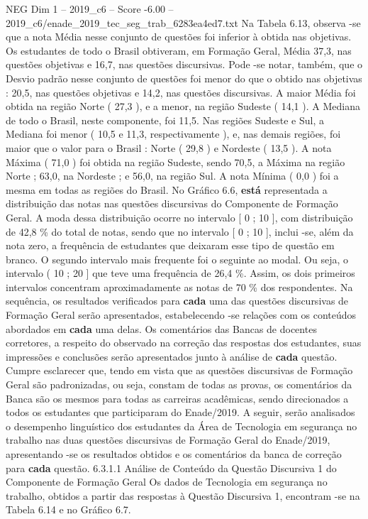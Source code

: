 \begin{textsample}{NEG Dim 1 – 2019\_c6 – Score -6.00 – 2019\_c6/enade\_2019\_tec\_seg\_trab\_6283ea4ed7.txt}
Na Tabela 6.13, observa -se que a nota Média nesse conjunto de questões foi inferior à obtida nas objetivas.
Os estudantes de todo o Brasil obtiveram, em Formação Geral, Média 37,3, nas questões objetivas e 16,7, nas questões discursivas.
Pode -se notar, também, que o Desvio padrão nesse conjunto de questões foi menor do que o obtido nas objetivas : 20,5, nas questões objetivas e 14,2, nas questões discursivas.
A maior Média foi obtida na região Norte ( 27,3 ), e a menor, na região Sudeste ( 14,1 ).
A Mediana de todo o Brasil, neste componente, foi 11,5.
Nas regiões Sudeste e Sul, a Mediana foi menor ( 10,5 e 11,3, respectivamente ), e, nas demais regiões, foi maior que o valor para o Brasil : Norte ( 29,8 ) e Nordeste ( 13,5 ).
A nota Máxima ( 71,0 ) foi obtida na região Sudeste, sendo 70,5, a Máxima na região Norte ; 63,0, na Nordeste ; e 56,0, na região Sul.
A nota Mínima ( 0,0 ) foi a mesma em todas as regiões do Brasil.
No Gráfico 6.6, \textbf{está} representada a distribuição das notas nas questões discursivas do Componente de Formação Geral.
A moda dessa distribuição ocorre no intervalo [ 0 ; 10 ], com distribuição de 42,8 \% do total de notas, sendo que no intervalo [ 0 ; 10 ], inclui -se, além da nota zero, a frequência de estudantes que deixaram esse tipo de questão em branco.
O segundo intervalo mais frequente foi o seguinte ao modal.
Ou seja, o intervalo ( 10 ; 20 ] que teve uma frequência de 26,4 \%.
Assim, os dois primeiros intervalos concentram aproximadamente as notas de 70 \% dos respondentes.
Na sequência, os resultados verificados para \textbf{cada} uma das questões discursivas de Formação Geral serão apresentados, estabelecendo -se relações com os conteúdos abordados em \textbf{cada} uma delas.
Os comentários das Bancas de docentes corretores, a respeito do observado na correção das respostas dos estudantes, suas impressões e conclusões serão apresentados junto à análise de \textbf{cada} questão.
Cumpre esclarecer que, tendo em vista que as questões discursivas de Formação Geral são padronizadas, ou seja, constam de todas as provas, os comentários da Banca são os mesmos para todas as carreiras acadêmicas, sendo direcionados a todos os estudantes que participaram do Enade/2019.
A seguir, serão analisados o desempenho linguístico dos estudantes da Área de Tecnologia em segurança no trabalho nas duas questões discursivas de Formação Geral do Enade/2019, apresentando -se os resultados obtidos e os comentários da banca de correção para \textbf{cada} questão. 6.3.1.1 Análise de Conteúdo da Questão Discursiva 1 do Componente de Formação Geral Os dados de Tecnologia em segurança no trabalho, obtidos a partir das respostas à Questão Discursiva 1, encontram -se na Tabela 6.14 e no Gráfico 6.7.

\end{textsample}

